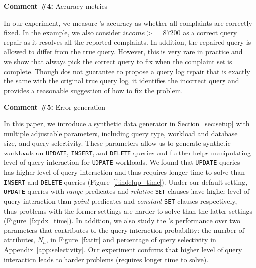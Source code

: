 

\comskip

\noindent
\textbf{Comment \#4:} Accuracy metrics
\begin{quote}
\end{quote}

In our experiment, we measure \sys's accuracy as whether all complaints are
correctly fixed. In the example, we also consider $income >= 87200$ as a
correct query repair as it resolves all the reported complaints. In addition,
the repaired query is allowed to differ from the true query. However, this is
very rare in practice and we show that \sys always pick the correct query to
fix when the complaint set is complete. Though \sys dos not guarantee to
propose a query log repair that is exactly the same with the original true
query log, it identifies the incorrect query and provides a reasonable
suggestion of how to fix the problem.



\comskip

\noindent
\textbf{Comment \#5:} Error generation
\begin{quote}
\end{quote}

In this paper, we introduce a synthetic data generator in Section~\ref{sec:setup}
with multiple adjustable parameters, including query type, workload and
database size, and query selectivity.  These parameters allow us to generate 
synthetic workloads on \texttt{UPDATE}, \texttt{INSERT}, and \texttt{DELETE} queries and
further helps manipulating level of query interaction for \texttt{UDPATE}-workloads. 
We found that \texttt{UPDATE} queries has higher level of query interaction and thus
requires longer time to solve than \texttt{INSERT} and \texttt{DELETE} queries 
(Figure~\ref{f:indelup_time}). Under our default setting, \texttt{UPDATE} queries with 
\textit{range} predicates and \textit{relative} \texttt{SET} clauses have higher level of query
 interaction than \textit{point} predicates and \textit{constant} 
\texttt{SET} clauses respectively, thus problems with the former settings are 
harder to solve than the latter settings (Figure~\ref{f:qidx_time}). 
In addition, we also study the \sys's performance over two parameters that 
contributes to the query interaction probability: the number of attributes, $N_a$, in 
Figure~\ref{f:attr} and percentage of query selectivity in Appendix~\ref{app:selectivity}.
Our experiment confirms that higher level of query interaction leads to 
harder problems (requires longer time to solve). 


